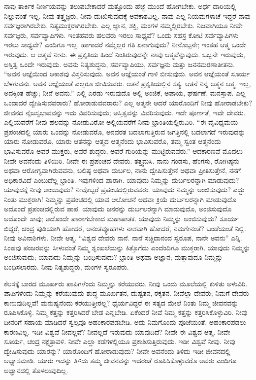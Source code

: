 ನಾವು ತಾರ್ಕಿಕ ನಿರ್ಣಯವನ್ನು ತಲುಪಬೇಕಾದರೆ ಮತ್ತೊಂದು ಹೆಜ್ಜೆ ಮುಂದೆ ಹೋಗಬೇಕು. ಅರ್ಧ ದಾರಿಯಲ್ಲಿ ನಿಲ್ಲುವಂತೆ ಇಲ್ಲ. ನೀವು ತತ್ತ್ವಜ್ಞರು, ನೀವು ದುಃಖಿಸುವುದಕ್ಕೆ ಅವಕಾಶವಿಲ್ಲ. ನಾವು ಎಲ್ಲ ನಿಯಮಗಳಾಚೆ ಇದ್ದರೆ ನಾವು ಸರ್ವಜ್ಞರಾಗಿರಬೇಕು, ನಿತ್ಯಮುಕ್ತರಾಗಿರಬೇಕು. ಎಲ್ಲ ಜ್ಞಾನ, ಶಕ್ತಿ, ಮಂಗಳ ನಮ್ಮಲ್ಲಿರಬೇಕು. ನಿಜವಾಗಿಯೂ ನೀವೇ ಸರ್ವಜ್ಞರು, ಸರ್ವವ್ಯಾಪಿಗಳು. ಇಂತಹವರು ಹಲವರು ಇರಲು ಸಾಧ್ಯವೆ? ಒಂದು ಸಹಸ್ರ ಕೋಟಿ ಸರ್ವವ್ಯಾಪಿಗಳು ಇರಲು ಸಾಧ್ಯವೇ? ಎಂದಿಗೂ ಇಲ್ಲ. ಹಾಗಾದರೆ ನಮ್ಮೆಲ್ಲರ ಗತಿ ಏನಾಗುವುದು? ನೀನೊಬ್ಬನೇ; ಇಂತಹ ಆತ್ಮ ಒಂದೇ ಇರುವುದು. ಆ ಆತ್ಮವೆ ನೀನು. ಈ ಪ್ರಕೃತಿಯ ಹಿಂದೆ ನಿಂತಿರುವುದನ್ನೇ ನಾವು ಆತ್ಮವೆನ್ನುವುದು. ಒಬ್ಬನೇ ಇರುವುದು, ಅಸ್ತಿತ್ವ ಒಂದೇ ಇರುವುದು. ಅವನು ನಿತ್ಯಶುದ್ಧನು, ಸರ್ವವ್ಯಾಪಿಯು, ಸರ್ವಜ್ಞನು ಮತ್ತು ಜನನಮರಣಾತೀತನು. “ಅವನ ಆಜ್ಞೆಯಿಂದ ಆಕಾಶವು ವಿಸ್ತರಿಸುವುದು. ಅವನ ಆಜ್ಞೆಯಂತೆ ಗಾಳಿ ಬೀಸುವುದು. ಅವನ ಆಜ್ಞೆಯಂತೆ ಸೂರ್ಯ ಬೆಳಗುವನು. ಅವನ ಆಜ್ಞೆಯಂತೆ ಎಲ್ಲರೂ ಜೀವಿಸುವರು. ಆತನೆ ಪ್ರಕೃತಿಯಲ್ಲಿನ ಸತ್ಯ. ಆತನೆ ನಿನ್ನ ಆತ್ಮನ ಆತ್ಮ. ಇಲ್ಲ, ಅದಕ್ಕಿಂತ ಹೆಚ್ಚು; ನೀನೆ ಅವನು.” ಎಲ್ಲಿ ಎರಡು ಇರುವುದೊ ಅಲ್ಲಿ ಅಂಜಿಕೆ, ಅಪಾಯ, ಘರ್ಷಣೆ, ಮನಸ್ತಾಪ. ಎಲ್ಲ ಒಂದಾದರೆ ದ್ವೇಷಿಸುವವರಾರು? ಹೋರಾಡುವವರಾರು? ಎಲ್ಲ ಆತ್ಮನೇ ಆದರೆ ಯಾರೊಂದಿಗೆ ನೀವು ಹೋರಾಡಬೇಕು? ಜೀವನದ ನೈಜಸ್ವಭಾವವನ್ನು ಇದು ವಿವರಿಸುವುದು; ಅಸ್ತಿತ್ವವನ್ನು ವಿವರಿಸುವುದು. ಇದೇ ಪೂರ್ಣತೆ, ಇದೇ ದೇವರು. ಎಲ್ಲಿಯವರೆಗೆ ನೀವು ಹಲವನ್ನು ನೋಡುವಿರೋ ಅಲ್ಲಿಯವರೆಗೆ ನೀವು ಭ್ರಾಂತಿಯಲ್ಲಿರುವಿರಿ. “ಈ ವೈವಿಧ್ಯಮಯ ಪ್ರಪಂಚದಲ್ಲಿ ಯಾರು ಒಂದನ್ನು ನೋಡುವರೊ, ಅನವರತ ಬದಲಾಗುತ್ತಿರುವ ಜಗತ್ತಿನಲ್ಲಿ ಬದಲಾಗದೆ ಇರುವುದನ್ನು ಯಾರು ನೋಡುವರೊ, ಯಾರು ಆತನನ್ನು ಆತ್ಮದ ಆತ್ಮನೆಂದು ಭಾವಿಸುವರೊ, ತಮ್ಮ ಸ್ವಂತ ಆತ್ಮನೆಂದು ಭಾವಿಸುವರೊ ಅವರೆ ಮುಕ್ತರು, ಅವರೆ ಶುದ್ಧರು, ಅವರೆ ಗುರಿಯನ್ನು ಮುಟ್ಟಿರುವವರು.” ಆದಕಾರಣವೆ ಮೊದಲು ನೀವೇ ಅವನೆಂದು ತಿಳಿಯಿರಿ. ನೀವೇ ಈ ಪ್ರಪಂಚದ ದೇವರು. ತತ್ತ್ವಮಸಿ. ನಾನು ಗಂಡಸು, ಹೆಂಗಸು, ರೋಗಿಷ್ಠನು ಅಥವಾ ಆರೋಗ್ಯವಾಗಿರುವವನು, ಬಲಿಷ್ಠ ಅಥವಾ ದುರ್ಬಲ, ನಾನು ದ್ವೇಷಿಸುತ್ತೇನೆ ಅಥವಾ ಪ್ರೀತಿಸುತ್ತೇನೆ, ನನಗೆ ಅಧಿಕಾರವಿದೆ ಎಂಬುದೆಲ್ಲ ಭ್ರಾಂತಿ. ಇವುಗಳಿಂದ ಪಾರಾಗಿ. ಯಾವುದು ನಿಮ್ಮನ್ನು ದುರ್ಬಲರನ್ನಾಗಿ ಮಾಡುವುದು? ಯಾವುದಕ್ಕೆ ನೀವು ಅಂಜುವುದು? ನೀವೊಬ್ಬರೆ ಪ್ರಪಂಚದಲ್ಲಿರುವವರು. ಯಾವುದು ನಿಮ್ಮನ್ನು ಅಂಜಿಸುವುದು? ಎದ್ದು ನಿಂತು ಮುಕ್ತರಾಗಿ! ನಿಮ್ಮನ್ನು ಪ್ರಪಂಚದಲ್ಲಿ ಯಾವ ಆಲೋಚನೆ ಅಥವಾ ಕ್ರಿಯೆ ದುರ್ಬಲರನ್ನಾಗಿ ಮಾಡುವುದೊ ಅದೊಂದೆ ಪ್ರಪಂಚದಲ್ಲಿರುವ ಪಾಪ. ಯಾವುದು ಜನರನ್ನು ದುರ್ಬಲರನ್ನಾಗಿ ಮಾಡುವುದೊ, ಅಂಜಿಸುವುದೊ ಅದೊಂದೇ ಸಾವು; ಅದೊಂದೇ ಪಾರಾಗಬೇಕಾದ ಮಹಾಪಾತಕ. ಯಾವುದು ನಿಮ್ಮನ್ನು ಅಂಜಿಸುವುದು? ಸೂರ್ಯ ಬಿದ್ದರೆ, ಚಂದ್ರ ಪುಡಿಯಾಗಿ ಹೋದರೆ, ಅನಂತವ್ಯೂಹಗಳು ನಾಶವಾಗಿ ಹೋದರೆ, ನಿಮಗೇನಂತೆ? ಬಂಡೆಯಂತೆ ನಿಲ್ಲಿ. ನೀವು ಅವಿನಾಶಿಗಳು. ನೀವೇ ಆತ್ಮ. “ವಿಶ್ವದ ದೇವರು ನಾನೆ. ನಾನೆ ಸಚ್ಚಿದಾನಂದ ಸ್ವರೂಪ, ನಾನೇ ಅವನು” ಎನ್ನಿ. ಸಿಂಹವು ಪಂಜರವನ್ನು ಸೀಳುವಂತೆ ನಿಮ್ಮ ಶೃಂಖಲೆಯನ್ನು ಕಿತ್ತೊಗೆದು ಎಂದೆಂದಿಗೂ ಮುಕ್ತರಾಗಿ. ಯಾವುದು ನಿಮ್ಮನ್ನು ಅಂಜಿಸುವುದು; ಯಾವುದು ನಿಮ್ಮನ್ನು ಬಂಧಿಸುವುದು? ಭ್ರಾಂತಿ ಅಥವಾ ಅಜ್ಞಾನ; ಮತ್ತಾವುದೂ ನಿಮ್ಮನ್ನು ಬಂಧಿಸಲಾರದು. ನೀವು ನಿತ್ಯಶುದ್ಧರು, ಮಂಗಳ ಸ್ವರೂಪರು.

\vskip 0.2cm

ಕೆಲಸಕ್ಕೆ ಬಾರದ ಮೂರ್ಖರು ಪಾಪಿಗಳೆಂದು ನಿಮ್ಮನ್ನು ಕರೆಯುವರು. ನೀವು ಒಂದು ಮೂಲೆಯಲ್ಲಿ ಕುಳಿತು ಅಳುವಿರಿ. ಪಾಪಿಗಳೆಂದು ನಿಮ್ಮನ್ನು ಕರೆಯುವುದು ಶುದ್ಧ ಮೂರ್ಖತನ, ದುಷ್ಟತನ, ಠಕ್ಕತನ. ನೀವೆಲ್ಲಾ ದೇವರು; ನಿಮಗೆ ದೇವರು ಕಾಣುವುದಿಲ್ಲವೆ! ಮನುಷ್ಯನೆಂದು ಕರೆಯುತ್ತೀರಲ್ಲ? ಧೈರ್ಯವಿದ್ದರೆ ಈ ಸತ್ಯದ ಮೇಲೆ ನಿಂತು ನಿಮ್ಮ ಜೀವನವನ್ನು ರೂಪಿಸಿಕೊಳ್ಳಿ. ನಿಮ್ಮ ಕತ್ತನ್ನು ಕತ್ತರಿಸಿದರೆ ಬೇಡ ಎನ್ನಬೇಡಿ. ಏಕೆಂದರೆ ನೀವೆ ನಿಮ್ಮ ಕತ್ತನ್ನು ಕತ್ತರಿಸಿಕೊಳ್ಳುವಿರಿ. ನೀವು ದೀನರಿಗೆ ಸಹಾಯ ಮಾಡಿದರೆ ಸ್ವಲ್ಪವೂ ಅಹಂಕಾರಪಡಬೇಡಿ. ಅದು ನಿಮಗೊಂದು ಪೂಜೆಯಂತೆ, ಅಹಂಕಾರಪಡಲು ಕಾರಣವಿಲ್ಲ. ಇಡೀ ವಿಶ್ವವೆ ನೀವಲ್ಲವೆ? ನೀವಲ್ಲದೆ ಇರುವುದು ಯಾವುದಿದೆ? ನೀವೇ ಈ ವಿಶ್ವದ ಆತ್ಮ. ನೀವೇ ಸೂರ್ಯ, ಚಂದ್ರ ನಕ್ಷತ್ರಾವಳಿ. ನೀವೇ ಎಲ್ಲಾ ಕಡೆಗಳಲ್ಲಿಯೂ ಪ್ರಕಾಶಿಸುತ್ತಿರುವುದು. ಇಡೀ ವಿಶ್ವವೆ ನೀವು. ನೀವು ದ್ವೇಷಿಸುವುದು ಯಾರನ್ನು? ಯಾರೊಂದಿಗೆ ಹೋರಾಡುವುದು? ನೀವೇ ಅವನೆಂದು ತಿಳಿದು ಇಡೀ ಜೀವನದಲ್ಲಿ ಅಭ್ಯಾಸಮಾಡಿ. ಯಾರು ಇದನ್ನು ತಿಳಿದು ತಮ್ಮ ಜೀವನವನ್ನು ಇದರಂತೆ ರೂಪಿಸಿಕೊಳ್ಳುವರೊ ಅವರು ಎಂದಿಗೂ ಅಜ್ಞಾನದಲ್ಲಿ ತೊಳಲುವುದಿಲ್ಲ.

